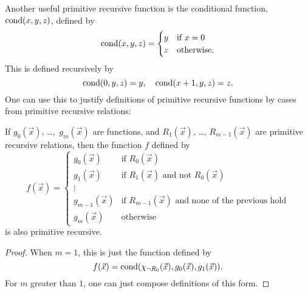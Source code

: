 \documentclass[../../../include/open-logic-section]{subfiles}
\begin{document}
Another useful primitive recursive function is the conditional
function, $\mathrm{cond}(x,y,z)$, defined by
\[
\fn{cond}(x,y,z) = \begin{cases}
  y & \text{if $x = 0$} \\
  z & \text{otherwise}.
\end{cases}
\]
This is defined recursively by
\[
\mathrm{cond}(0,y,z) = y, \quad \mathrm{cond}(x+1,y,z) = z.
\]
One can use this to justify definitions of primitive recursive functions
by cases from primitive recursive relations:

\begin{prop}
If $g_0(\vec x)$, \dots,~$g_m(\vec x)$ are functions, and $R_1(\vec
x)$, \dots, $R_{m-1}(\vec x)$ are primitive recursive relations, then
the function $f$ defined by
\[
f(\vec x) = \begin{cases}
    g_0(\vec x) & \text{if $R_0(\vec{x})$} \\
    g_1(\vec x) & \text{if $R_1(\vec{x})$ and not $R_0(\vec{x})$} \\
    \vdots & \\
    g_{m-1}(\vec x) & \text{if $R_{m-1}(\vec{x})$ and none of the
      previous hold}
    \\
    g_m(\vec x) & \mbox{otherwise}
\end{cases}
\]
is also primitive recursive.
\end{prop}

\begin{proof}
  When $m = 1$, this is just the function defined by
  \[
  f(\vec x) = \mathrm{cond}(\chi_{\lnot R_0}(\vec x),g_0(\vec x),g_1(\vec
  x)).
  \]
  For $m$ greater than $1$, one can just compose definitions of this
  form.
\end{proof}
\end{document}
